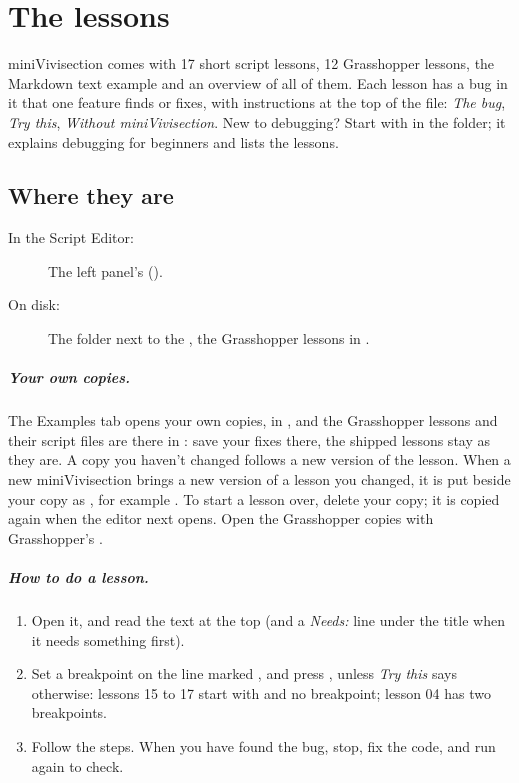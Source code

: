 \chapter{The lessons}\label{ch:examples}

miniVivisection comes with 17 short script lessons, 12 Grasshopper lessons, the Markdown text example and an overview of all of
them. Each lesson has a bug in it that one feature finds or fixes, with instructions at the top of the file: \emph{The bug},
\emph{Try this}, \emph{Without miniVivisection}. New to debugging? Start with  in the
 folder; it explains debugging for beginners and lists the lessons.

\section{Where they are}

\begin{description}
  \item[In the Script Editor:] The left panel's  ().
  \item[On disk:] The  folder next to the , the Grasshopper lessons in .
\end{description}

\paragraph{Your own copies.} The Examples tab opens your own copies, in ,
and the Grasshopper lessons and their script files are there in : save your fixes there, the shipped
lessons stay as they are. A copy you haven't changed follows a new version of the lesson. When a new miniVivisection
brings a new version of a lesson you changed, it is put beside your copy as , for example
. To start a lesson over, delete your copy; it is copied again when the editor next opens.
Open the Grasshopper copies with Grasshopper's .

\paragraph{How to do a lesson.}
\begin{enumerate}[label=\arabic*.]
  \item Open it, and read the text at the top (and a \emph{Needs:} line under the title when it needs something first).
  \item Set a breakpoint on the line marked , and press , unless \emph{Try this} says
        otherwise: lessons 15 to 17 start with  and no breakpoint; lesson 04 has two breakpoints.
  \item Follow the steps. When you have found the bug, stop, fix the code, and run again to check.
\end{enumerate}

